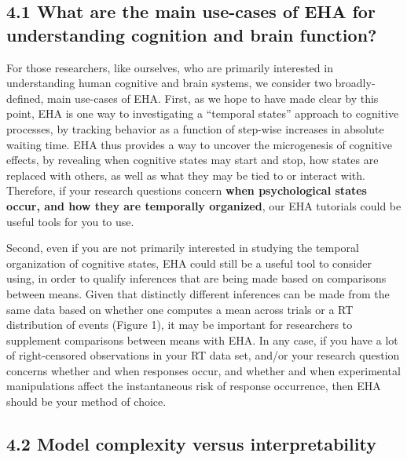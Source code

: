 \documentclass[
  man, donotrepeattitle,floatsintext]{apa6}
\begin{document}
\subsection{4.1 What are the main use-cases of EHA for understanding cognition and brain function?}\label{what-are-the-main-use-cases-of-eha-for-understanding-cognition-and-brain-function}

For those researchers, like ourselves, who are primarily interested in understanding human cognitive and brain systems, we consider two broadly-defined, main use-cases of EHA. First, as we hope to have made clear by this point, EHA is one way to investigating a ``temporal states'' approach to cognitive processes, by tracking behavior as a function of step-wise increases in absolute waiting time. EHA thus provides a way to uncover the microgenesis of cognitive effects, by revealing when cognitive states may start and stop, how states are replaced with others, as well as what they may be tied to or interact with. Therefore, if your research questions concern \textbf{when psychological states occur, and how they are temporally organized}, our EHA tutorials could be useful tools for you to use.

Second, even if you are not primarily interested in studying the temporal organization of cognitive states, EHA could still be a useful tool to consider using, in order to qualify inferences that are being made based on comparisons between means. Given that distinctly different inferences can be made from the same data based on whether one computes a mean across trials or a RT distribution of events (Figure 1), it may be important for researchers to supplement comparisons between means with EHA.
In any case, if you have a lot of right-censored observations in your RT data set, and/or your research question concerns whether and when responses occur, and whether and when experimental manipulations affect the instantaneous risk of response occurrence, then EHA should be your method of choice.

\subsection{4.2 Model complexity versus interpretability}\label{model-complexity-versus-interpretability}
\end{document}
